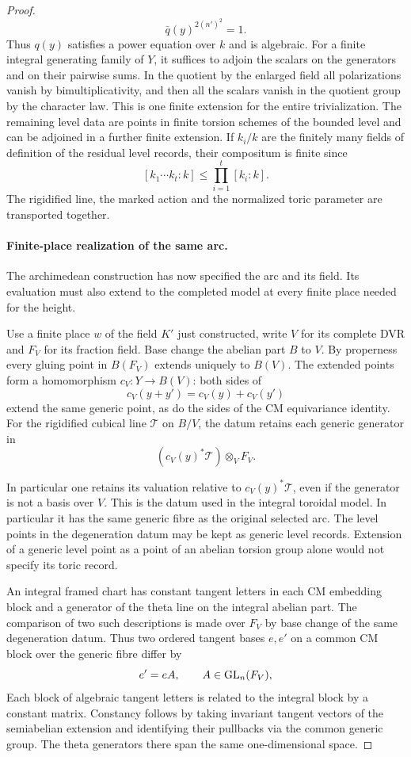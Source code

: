 \begin{proof}
\[
  \bar q(y)^{2(n')^2}=1.
\]
 Thus \(q(y)\) satisfies a
power equation over \(k\) and is algebraic.
For a finite integral generating family of \(Y\), it suffices to
adjoin the scalars on the generators and on their pairwise sums.
In the quotient by the enlarged field all polarizations vanish
by bimultiplicativity, and then all the scalars vanish in the
quotient group by the character law. This is one finite extension
for the entire trivialization. The remaining level data are points
in finite torsion schemes of the bounded level and can be adjoined
in a further finite extension.
If \(k_i/k\) are the finitely many fields of definition of the residual level records, their compositum is finite since
\[
  [k_1\cdots k_t:k]\le\prod_{i=1}^t[k_i:k].
\]
 The rigidified line, the marked
action and the normalized toric parameter are transported together.
\label{cor:slice-cm-arc-model-3}

\paragraph{Finite-place realization of the same arc.}

The archimedean construction has now specified the arc and its field. Its evaluation must also extend to the completed model at every finite place needed for the height.

Use a finite place \(w\) of the field \(K'\) just constructed,
write \(V\) for its complete DVR and \(F_V\) for its fraction
field. Base change the abelian part \(B\) to \(V\). By properness
every gluing point in \(B(F_V)\) extends uniquely to \(B(V)\).
The extended points form a homomorphism \(c_V:Y\to B(V)\):
both sides of 
\[
  c_V(y+y')=c_V(y)+c_V(y')
\]
 extend the same
generic point, as do the sides of the CM equivariance identity.
For the rigidified cubical line \(\mathcal T\) on \(B/V\),
the datum retains each generic generator in
\[
             (c_V(y)^*\mathcal T)\otimes_V F_V .
\]

In particular one retains its valuation relative to
\(c_V(y)^*\mathcal T\), even if the generator is not a basis
over \(V\). This is
the datum used in the integral toroidal model. In particular it
has the same generic fibre as the original selected arc. The
level points in the degeneration datum may be kept as generic
level records. Extension of a generic level point as a point of
an abelian torsion group alone would not specify its toric record.

An integral framed chart has constant tangent letters in each
CM embedding block and a generator of the theta line on the
integral abelian part. The comparison of two such descriptions
is made over \(F_V\) by base change of the same degeneration
datum.
Thus two ordered tangent bases \(e,e'\) on a common CM block over the generic fibre differ by
\[
  e'=eA,\qquad A\in{\rm GL}_n(F_V),
\]
 Each block of algebraic tangent letters is related to the
integral block by a constant matrix. Constancy follows by taking
invariant tangent vectors of the semiabelian extension and
identifying their pullbacks via the common generic group. The
theta generators there span the same one-dimensional space.


\end{proof}
